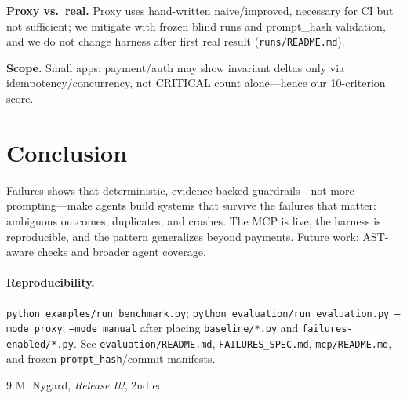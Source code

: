 \documentclass[conference]{IEEEtran}
\begin{document}
\textbf{Proxy vs.\ real.} Proxy uses hand-written naive/improved, necessary for CI but not sufficient; we mitigate with frozen blind runs and prompt\_hash validation, and we do not change harness after first real result (\texttt{runs/README.md}).

\textbf{Scope.} Small apps: payment/auth may show invariant deltas only via idempotency/concurrency, not CRITICAL count alone---hence our 10-criterion score.

\section{Conclusion}
Failures shows that deterministic, evidence-backed guardrails---not more prompting---make agents build systems that survive the failures that matter: ambiguous outcomes, duplicates, and crashes. The MCP is live, the harness is reproducible, and the pattern generalizes beyond payments. Future work: AST-aware checks and broader agent coverage.

\paragraph{Reproducibility.} \texttt{python examples/run\_benchmark.py}; \texttt{python evaluation/run\_evaluation.py --mode proxy}; \texttt{--mode manual} after placing \texttt{baseline/*.py} and \texttt{failures-enabled/*.py}. See \texttt{evaluation/README.md}, \texttt{FAILURES\_SPEC.md}, \texttt{mcp/README.md}, and frozen \texttt{prompt\_hash}/commit manifests.

\begin{thebibliography}{9}
 M. Nygard, \emph{Release It!}, 2nd ed.
\end{thebibliography}
\end{document}
